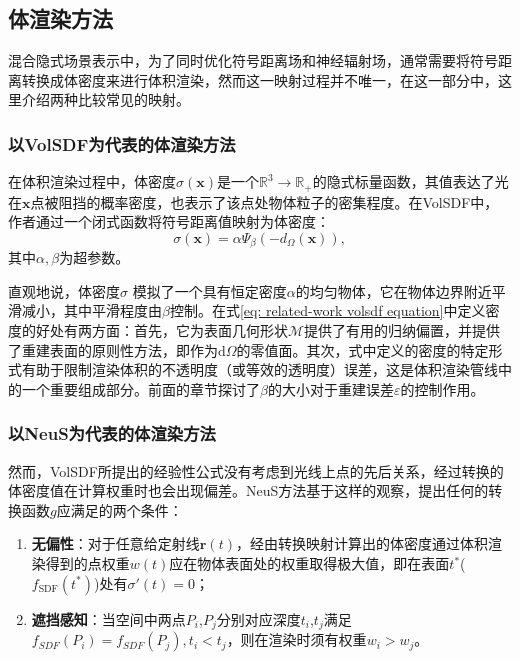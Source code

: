 \subsection{体渲染方法}
混合隐式场景表示中，为了同时优化符号距离场和神经辐射场，通常需要将符号距离转换成体密度来进行体积渲染，然而这一映射过程并不唯一，在这一部分中，这里介绍两种比较常见的映射。

\subsubsection{以VolSDF为代表的体渲染方法}
在体积渲染过程中，体密度$\sigma(\mathbf{x})$是一个$\mathbb{R}^3\to\mathbb{R}_+$的隐式标量函数，其值表达了光在$\mathbf{x}$点被阻挡的概率密度，也表示了该点处物体粒子的密集程度。在VolSDF\cite{yariv_volume_2021}中，作者通过一个闭式函数将符号距离值映射为体密度：
\begin{equation}
    \sigma(\mathbf{x}) = \alpha\Psi_\beta(-d_\Omega(\mathbf{x})),
    \label{eq: related-work volsdf equation}
\end{equation}
其中$\alpha,\beta$为超参数。

直观地说，体密度$\sigma$ 模拟了一个具有恒定密度$\alpha$的均匀物体，它在物体边界附近平滑减小，其中平滑程度由$\beta$控制。在式\ref{eq: related-work volsdf equation}中定义密度的好处有两方面：首先，它为表面几何形状$\mathcal{M}$提供了有用的归纳偏置，并提供了重建表面的原则性方法，即作为$\text{d}\Omega$的零值面。其次，式中定义的密度的特定形式有助于限制渲染体积的不透明度（或等效的透明度）误差，这是体积渲染管线中的一个重要组成部分。前面的章节探讨了$\beta$的大小对于重建误差$\varepsilon$的控制作用。

\subsubsection{以NeuS为代表的体渲染方法}
然而，VolSDF所提出的经验性公式没有考虑到光线上点的先后关系，经过转换的体密度值在计算权重时也会出现偏差。NeuS\cite{wang_neus_2021}方法基于这样的观察，提出任何的转换函数$g$应满足的两个条件：
\begin{enumerate}
    \item \textbf{无偏性}：对于任意给定射线$\mathbf{r}(t)$，经由转换映射计算出的体密度通过体积渲染得到的点权重$w(t)$应在物体表面处的权重取得极大值，即在表面$t^*$($f_\text{SDF}(t^*)$)处有$\sigma'(t) = 0$；
    \item \textbf{遮挡感知}：当空间中两点$P_i$,$P_j$分别对应深度$t_i$,$t_j$满足$f_{SDF} (P_i )=f_{SDF} (P_j ),t_i<t_j$，则在渲染时须有权重$w_i>w_j$。
\end{enumerate}

